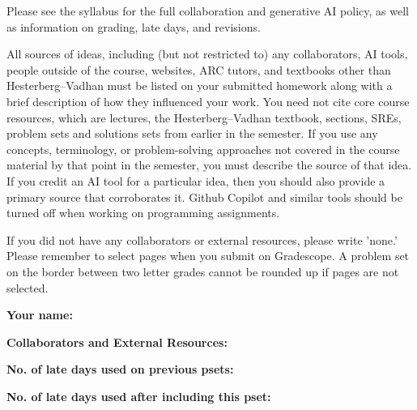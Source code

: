\documentclass[11pt]{article}
\begin{document}

Please see the syllabus for the full collaboration and generative AI policy, as well as information on grading, late days, and revisions.

All sources of ideas, including (but not restricted to) any collaborators, AI tools, people outside of the course, websites, ARC tutors, and textbooks other than Hesterberg--Vadhan must be listed on your submitted homework along with a brief description of how they influenced your work. You need not cite core course resources, which are lectures, the Hesterberg--Vadhan textbook, sections, SREs, problem sets and solutions sets from earlier in the semester. If you use any concepts, terminology, or problem-solving approaches not covered in the course material by that point in the semester, you must describe the source of that idea. If you credit an AI tool for a particular idea, then you should also provide a primary source that corroborates it. Github Copilot and similar tools should be turned off when working on programming assignments.

If you did not have any collaborators or external resources, please write 'none.' Please remember to select pages when you submit on Gradescope. A problem set on the border between two letter grades cannot be rounded up if pages are not selected.

\vspace{1em}

\textbf{Your name: }

\textbf{Collaborators and External Resources:}

\textbf{No. of late days used on previous psets: }

\textbf{No. of late days used after including this pset: }
\end{document}
